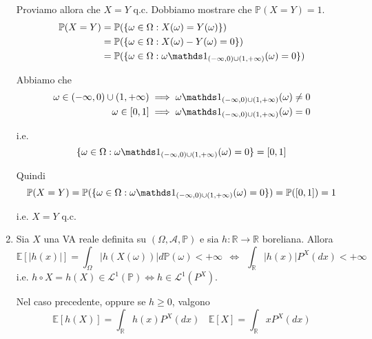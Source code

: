 \begin{enumerate}
Proviamo allora che $X=Y$ q.c. Dobbiamo mostrare che $\mathbb{P}( X=Y) =1$.\begin{equation*}
\begin{aligned}
\mathbb{P}( X=Y) & =\mathbb{P}(\{\omega \in \Omega :X( \omega ) =Y( \omega )\})\\
 & =\mathbb{P}(\{\omega \in \Omega :X( \omega ) -Y( \omega ) =0\})\\
 & =\mathbb{P}(\{\omega \in \Omega :\omega \Ind_{( -\infty ,0) \cup ( 1,+\infty )}( \omega ) =0\})
\end{aligned}
\end{equation*}

Abbiamo che\begin{equation*}
\begin{aligned}
\omega \in ( -\infty ,0) \cup ( 1,+\infty ) & \implies \omega \Ind_{( -\infty ,0) \cup ( 1,+\infty )}( \omega ) \neq 0\\
\omega \in [ 0,1] & \implies \omega \Ind_{( -\infty ,0) \cup ( 1,+\infty )}( \omega ) =0
\end{aligned}
\end{equation*}

i.e.\begin{equation*}
\{\omega \in \Omega :\omega \Ind_{( -\infty ,0) \cup ( 1,+\infty )}( \omega ) =0\} =[ 0,1]
\end{equation*}

Quindi\begin{equation*}
\mathbb{P}( X=Y) =\mathbb{P}(\{\omega \in \Omega :\omega \Ind_{( -\infty ,0) \cup ( 1,+\infty )}( \omega ) =0\}) =\mathbb{P}([ 0,1]) =1
\end{equation*}

i.e. $X=Y$ q.c.
\item \begin{theorem}
Sia $X$ una VA reale definita su $( \Omega ,\mathcal{A} ,\mathbb{P})$ e sia $h:\mathbb{R}\rightarrow \mathbb{R}$ boreliana. Allora
\begin{equation*}
\mathbb{E}[| h( x)| ] =\int _{\Omega }| h( X( \omega ))| d\mathbb{P}( \omega ) < +\infty \ \ \iff \ \ \int _{\mathbb{R}}| h( x)| P^{X}( dx) < +\infty 
\end{equation*}
i.e. $h\circ X=h( X) \in \mathcal{L}^{1}(\mathbb{P}) \iff h\in \mathcal{L}^{1}\left( P^{X}\right)$.

Nel caso precedente, oppure se $h\geq 0$, valgono\begin{equation*}
\mathbb{E}[ h( X)] =\int _{\mathbb{R}} h( x) P^{X}( dx) \ \ \ \ \mathbb{E}[ X] =\int _{\mathbb{R}} xP^{X}( dx)
\end{equation*}


\end{theorem}
\end{enumerate}
